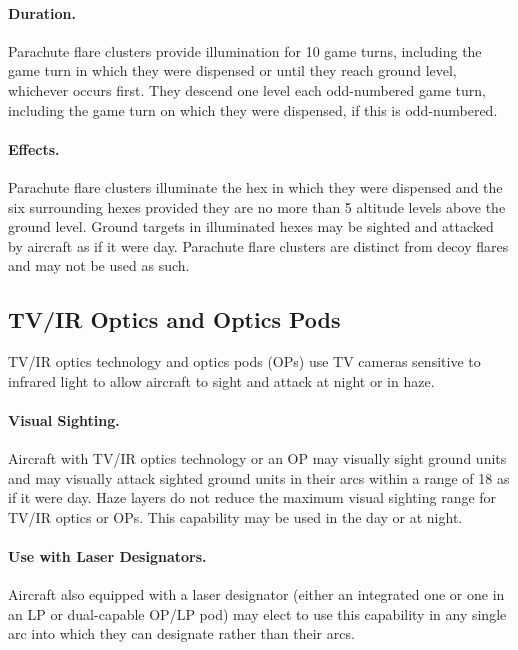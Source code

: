 \begin{advancedrules}
{\paragraph{Duration.} Parachute flare clusters provide illumination for 10 game turns, including the game turn in which they were dispensed or until they reach ground level, whichever occurs first. They descend one level each odd-numbered game turn, including the game turn on which they were dispensed, if this is odd-numbered.

\paragraph{Effects.} 
Parachute flare clusters illuminate the hex in which they were dispensed and the six surrounding hexes provided they are no more than 5 altitude levels above the ground level. Ground targets in illuminated hexes may be sighted and attacked by aircraft as if it were day. Parachute flare clusters are distinct from decoy flares and may not be used as such.

\subsection{TV/IR Optics and Optics Pods}
\label{rule:tv-ir-optics}

TV/IR optics technology and optics pods (OPs) use TV cameras sensitive to infrared light to allow aircraft to sight and attack at night or in haze.

\paragraph{Visual Sighting.} Aircraft with TV/IR optics technology or an OP may visually sight ground units and may visually attack sighted ground units in their  arcs within a range of 18 as if it were day. Haze layers do not reduce the maximum visual sighting range for TV/IR optics or OPs. This capability may be used in the day or at night. 

\paragraph{Use with Laser Designators.} Aircraft also equipped with a laser designator (either an integrated one or one in an LP or dual-capable OP/LP pod) may elect to use this capability in any single arc into which they can designate rather than their  arcs.

}
\end{advancedrules}
